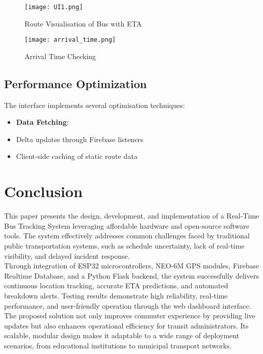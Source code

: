 \documentclass{article}
\begin{document}
\begin{multicols}{2}
\begin{figure}[H]
\centering
\texttt{[image: UI1.png]}
\caption{Route Visualisation of Bus with ETA}
\label{fig:UI}
\end{figure}

\begin{figure}[H]
\centering
\texttt{[image: arrival\_time.png]}
\caption{Arrival Time Checking}
\label{fig:UI2}
\end{figure}

\subsection{Performance Optimization}
The interface implements several optimisation techniques:

\begin{itemize}
\item \textbf{Data Fetching}:
\item Delta updates through Firebase listeners
\item Client-side caching of static route data
\end{itemize}




\section{Conclusion}
\vspace{0.5em}
This paper presents the design, development, and implementation of a Real-Time Bus Tracking System leveraging affordable hardware and open-source software tools. The system effectively addresses common challenges faced by traditional public transportation systems, such as schedule uncertainty, lack of real-time visibility, and delayed incident response.\\

Through integration of ESP32 microcontrollers, NEO-6M GPS modules, Firebase Realtime Database, and a Python Flask backend, the system successfully delivers continuous location tracking, accurate ETA predictions, and automated breakdown alerts. Testing results demonstrate high reliability, real-time performance, and user-friendly operation through the web dashboard interface.\\

The proposed solution not only improves commuter experience by providing live updates but also enhances operational efficiency for transit administrators. Its scalable, modular design makes it adaptable to a wide range of deployment scenarios, from educational institutions to municipal transport networks.


\end{multicols}
\end{document}
